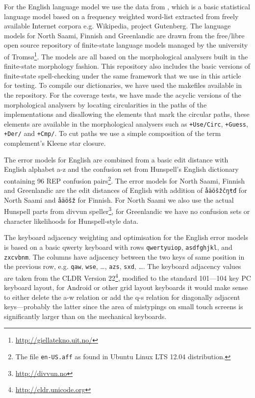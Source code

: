 \documentclass[a4paper,12pt]{article}
\begin{document}
For the English language model we use the data from
\cite{norvig/2010,pirinen2012effects}, which is a basic statistical language
model based on a frequency weighted word-list extracted from freely available
Internet corpora e.g. Wikipedia, project Gutenberg.  The language models for
North Saami, Finnish and Greenlandic are drawn from the free/libre open source
repository of finite-state language models managed by the university of
Tromsø\footnote{\url{http://giellatekno.uit.no/}}. The models are all based on
the morphological analysers built in the finite-state morphology
\cite[]{beesley2003finite} fashion. This repository also includes the basic
versions of finite-state spell-checking under the same framework that we use in
this article for testing. To compile our dictionaries, we have used the
makefiles available in the repository.  For the coverage tests, we have made
the acyclic versions of the morphological analysers by locating circularities
in the paths of the implementations and disallowing the elements that mark the
circular paths, these elements are available in the morphological analysers
such as \texttt{+Use/Circ}, \texttt{+Guess}, \texttt{+Der/} and \texttt{+Cmp/}.
To cut paths we use a simple composition of the term complement's Kleene star
closure.

The error models for English are combined from a basic edit distance with
English alphabet a-z and the confusion set from Hunspell's English dictionary
containing 96 REP confusion pairs\footnote{The file \texttt{en-US.aff} as found
in Ubuntu Linux LTS 12.04 distribution.}. The error models for North Saami,
Finnish and Greenlandic are the edit distances of English with addition of
\texttt{åäöšžčŋŧđ} for North Saami and \texttt{åäöšž} for Finnish. For North
Saami we also use the actual Hunspell parts from divvun
speller\footnote{\url{http://divvun.no}}, for Greenlandic we have no confusion
sets or character likelihoods for Hunspell-style data.

The keyboard adjacency weighting and optimisation for the English error models
is based on a basic qwerty keyboard with rows \texttt{qwertyuiop},
\texttt{asdfghjkl}, and \texttt{zxcvbnm}. The columns have adjacency between
the two keys of same position in the previous row, e.g. \texttt{qaw},
\texttt{wse}, \ldots, \texttt{azs}, \texttt{sxd}, \ldots.  The keyboard
adjacency values are taken from the CLDR Version
22\footnote{\url{http://cldr.unicode.org}}, modified to the standard 101---104
key PC keyboard layout, for Android or other grid layout keyboards it would
make sense to either delete the a-w relation or add the q-s relation for
diagonally adjacent keys---probably the latter since the area of mistypings on
small touch screens is significantly larger than on the mechanical keyboards.
\end{document}
